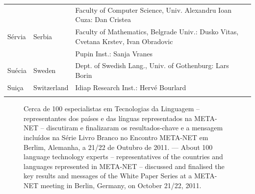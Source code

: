 \begin{longtable}{llp{105mm}}
  & & Faculty of Computer Science, Univ. Alexandru Ioan Cuza: Dan Cristea \\ \addlinespace
  Sérvia & \textcolor{grey1}{Serbia} & Faculty of Mathematics, Belgrade Univ.: Dusko Vitas, Cvetana Krstev, Ivan Obradovic \\ \addlinespace
  & & Pupin Inst.: Sanja Vranes \\ \addlinespace  
  Suécia & \textcolor{grey1}{Sweden} & Dept. of Swedish Lang., Univ. of Gothenburg: Lars Borin \\ \addlinespace 
  Suiça & \textcolor{grey1}{Switzerland} & Idiap Research Inst.: Hervé Bourlard \\ \addlinespace 
\end{longtable}
\normalsize

\renewcommand*{\figureformat}{}
\renewcommand*{\captionformat}{}

\begin{figure}[htbp]
  \center
  \caption{Cerca de 100 especialistas em Tecnologias da Linguagem -- representantes dos países e das línguas representados na META-NET -- discutiram e finalizaram os resultados-chave e a mensagem incluídos na Série Livro Branco no Encontro META-NET em Berlim, Alemanha, a 21/22 de Ou\-tu\-bro de 2011. --- \textcolor{grey1}{About 100 language technology experts -- representatives of the countries and languages represented in META-NET -- discussed and finalised the key results and messages of the White Paper Series at a META-NET meeting in Berlin, Germany, on October 21/22, 2011.}}
\end{figure}

\cleardoublepage

\label{whitepaperseries}

